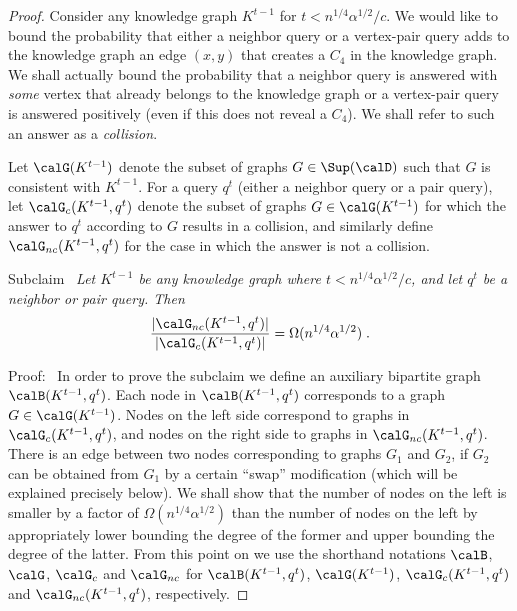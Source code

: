 \begin{proof}
Consider any knowledge graph $K^{t-1}$ for $t < n^{1/4}\alpha^{1/2}/c$. 
We would like to bound the probability that either a neighbor query or a vertex-pair query adds to the knowledge graph an edge $(x,y)$ that creates a $C_4$ in the knowledge graph. We shall actually bound the probability that a neighbor query is answered with \emph{some} vertex that already belongs to the knowledge graph or a vertex-pair query is answered positively (even if this does not reveal a $C_4$).
We shall refer to such an answer as a \emph{collision}. 

Let $\calG(K^{t-1})$ denote the subset of graphs  $G\in \Sup(\calD)$ such that %
$G$ is consistent with $K^{t-1}$. For a query $q^t$ (either a neighbor query or a pair query), let $\calG_c(K^{t-1},q^t)$ denote the subset of graphs  $G\in \calG(K^{t-1})$ for which the answer to $q^t$ according to %
$G$ results in a collision, and similarly define $\calG_{nc}(K^{t-1},q^t)$ for the case in which the answer is not a collision. %

\smallskip\noindent
\textsf{Subclaim}~
\emph{
Let $K^{t-1}$ be any knowledge graph where $t < n^{1/4}\alpha^{1/2}/c$, and let $q^t$ be a neighbor or pair query.
Then 
$$ \frac{|\calG_{nc}(K^{t-1},q^t)|}{|\calG_{c}(K^{t-1},q^t)|} = \Omega(n^{1/4}\alpha^{1/2}) \;.$$
}

\smallskip
\noindent
\textsf{Proof:}~
In order to prove the subclaim we define an auxiliary bipartite graph $\calB(K^{t-1},q^t)$. Each node in $\calB(K^{t-1},q^t)$ corresponds to a graph $G \in \calG(K^{t-1})$.
Nodes on the left side correspond to graphs in $\calG_{c}(K^{t-1},q^t)$, and nodes on the right side to graphs in $\calG_{nc}(K^{t-1},q^t)$.
 There is an edge between two nodes corresponding to graphs $G_1$ and $G_2$, if $G_2$ can be obtained from $G_1$ by a certain ``swap'' modification (which will be explained precisely below). We shall show that the number of nodes on the left is smaller by a factor of $\Omega(n^{1/4}\alpha^{1/2})$ than the number of nodes on the left by appropriately lower bounding the degree of the former and upper bounding the degree of the latter.
 From this point on we use the shorthand notations $\calB$, $\calG$, $\calG_c$ and $\calG_{nc}$ for $\calB(K^{t-1},q^t)$, $\calG(K^{t-1})$, $\calG_c(K^{t-1},q^t)$ and $\calG_{nc}(K^{t-1},q^t)$, respectively.


\end{proof}
